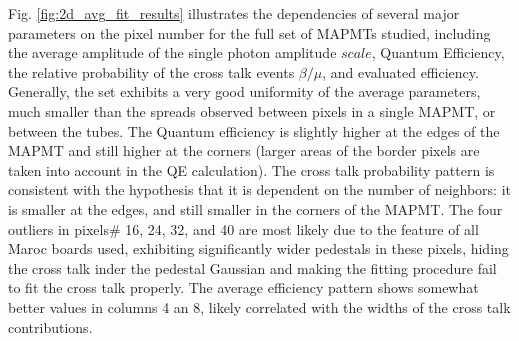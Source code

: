 Fig. \ref{fig:2d_avg_fit_results} illustrates the dependencies of several major parameters on the pixel number for the full set of MAPMTs studied, including the average amplitude of the single photon amplitude $scale$, Quantum Efficiency, the relative probability of the cross talk events $\beta/\mu$, and evaluated efficiency. Generally, the set exhibits a very good uniformity of the average parameters, much smaller than the spreads observed between pixels in a single MAPMT, or between the tubes. The Quantum efficiency is slightly higher at the edges of the MAPMT and still higher at the corners (larger areas of the border pixels are taken into account in the QE calculation). The cross talk probability pattern is consistent with the hypothesis that it is dependent on the number of neighbors: it is smaller at the edges, and still smaller in the corners of the MAPMT. The four outliers in pixels\# 16, 24, 32, and 40 are most likely due to the feature of all Maroc boards used, exhibiting significantly wider pedestals in these pixels, hiding the cross talk inder the pedestal Gaussian and making the fitting procedure fail to fit the cross talk properly. The average efficiency pattern shows somewhat better values in columns 4 an 8, likely correlated with the widths of the cross talk contributions.    
